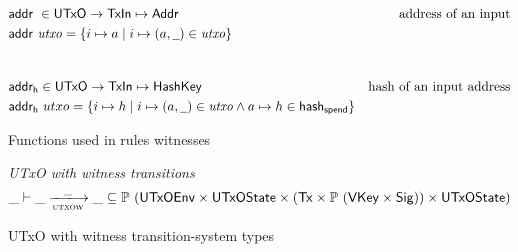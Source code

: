 \begin{figure}[htb]
  \begin{align*}
    & \addr{}{} \in \UTxO \to \TxIn \mapsto \Addr & \text{address of an input}\\
    & \addr{utxo} = \{ i \mapsto a \mid i \mapsto (a, \wcard) \in \var{utxo} \} \\
    \nextdef
    & \fun{addr_h} \in \UTxO \to \TxIn \mapsto \HashKey & \text{hash of an input address}\\
    & \fun{addr_h}~utxo = \{ i \mapsto h \mid i \mapsto (a, \wcard) \in \var{utxo}
      \wedge a \mapsto h \in \fun{hash_{spend}} \}
  \end{align*}
  \caption{Functions used in rules witnesses}
  \label{fig:derived-defs:utxow}
\end{figure}

\begin{figure}
  \emph{UTxO with witness transitions}
  \begin{equation*}
    \var{\_} \vdash
    \var{\_} \trans{utxow}{\_} \var{\_}
    \subseteq \powerset
    (\UTxOEnv \times \UTxOState \times (\Tx \times \powerset{(\VKey \times \Sig)}) \times \UTxOState)
  \end{equation*}
  \caption{UTxO with witness transition-system types}
  \label{fig:ts-types:utxow}
\end{figure}

